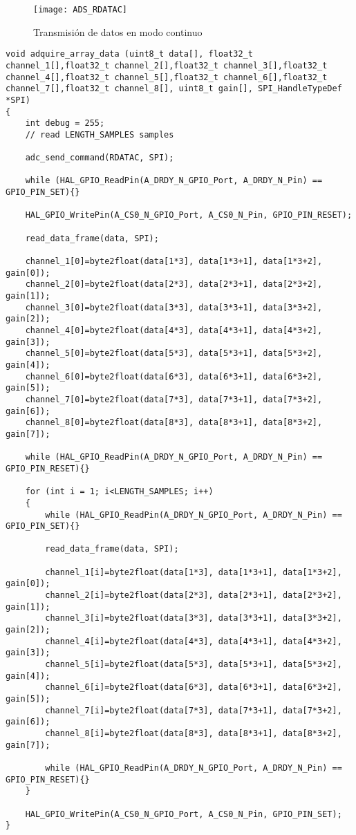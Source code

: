 \begin{figure} [H]
    \centering
    \texttt{[image: ADS\_RDATAC]}
    \caption{Transmisión de datos en modo continuo}
    \label{fig:ADS_RDATAC}
\end{figure}

\begin{lstlisting}[label=algoritmo:ADS_continuo,style = STM-code,frame=single,caption=Lectura de datos en modo continuo]
void adquire_array_data (uint8_t data[], float32_t channel_1[],float32_t channel_2[],float32_t channel_3[],float32_t channel_4[],float32_t channel_5[],float32_t channel_6[],float32_t channel_7[],float32_t channel_8[], uint8_t gain[], SPI_HandleTypeDef *SPI)
{
	int debug = 255;
	// read LENGTH_SAMPLES samples
		
	adc_send_command(RDATAC, SPI);
		
	while (HAL_GPIO_ReadPin(A_DRDY_N_GPIO_Port, A_DRDY_N_Pin) == GPIO_PIN_SET){}
		
	HAL_GPIO_WritePin(A_CS0_N_GPIO_Port, A_CS0_N_Pin, GPIO_PIN_RESET);
		
	read_data_frame(data, SPI);
			
	channel_1[0]=byte2float(data[1*3], data[1*3+1], data[1*3+2], gain[0]);
	channel_2[0]=byte2float(data[2*3], data[2*3+1], data[2*3+2], gain[1]);
	channel_3[0]=byte2float(data[3*3], data[3*3+1], data[3*3+2], gain[2]);
	channel_4[0]=byte2float(data[4*3], data[4*3+1], data[4*3+2], gain[3]);
	channel_5[0]=byte2float(data[5*3], data[5*3+1], data[5*3+2], gain[4]);
	channel_6[0]=byte2float(data[6*3], data[6*3+1], data[6*3+2], gain[5]);
	channel_7[0]=byte2float(data[7*3], data[7*3+1], data[7*3+2], gain[6]);
	channel_8[0]=byte2float(data[8*3], data[8*3+1], data[8*3+2], gain[7]);
			
	while (HAL_GPIO_ReadPin(A_DRDY_N_GPIO_Port, A_DRDY_N_Pin) == GPIO_PIN_RESET){}
			
	for (int i = 1; i<LENGTH_SAMPLES; i++)
	{
		while (HAL_GPIO_ReadPin(A_DRDY_N_GPIO_Port, A_DRDY_N_Pin) == GPIO_PIN_SET){}
			
		read_data_frame(data, SPI);

		channel_1[i]=byte2float(data[1*3], data[1*3+1], data[1*3+2], gain[0]);
		channel_2[i]=byte2float(data[2*3], data[2*3+1], data[2*3+2], gain[1]);
		channel_3[i]=byte2float(data[3*3], data[3*3+1], data[3*3+2], gain[2]);
		channel_4[i]=byte2float(data[4*3], data[4*3+1], data[4*3+2], gain[3]);
		channel_5[i]=byte2float(data[5*3], data[5*3+1], data[5*3+2], gain[4]);
		channel_6[i]=byte2float(data[6*3], data[6*3+1], data[6*3+2], gain[5]);
		channel_7[i]=byte2float(data[7*3], data[7*3+1], data[7*3+2], gain[6]);
		channel_8[i]=byte2float(data[8*3], data[8*3+1], data[8*3+2], gain[7]);
				
		while (HAL_GPIO_ReadPin(A_DRDY_N_GPIO_Port, A_DRDY_N_Pin) == GPIO_PIN_RESET){}
	}
		
	HAL_GPIO_WritePin(A_CS0_N_GPIO_Port, A_CS0_N_Pin, GPIO_PIN_SET);
}
\end{lstlisting}

